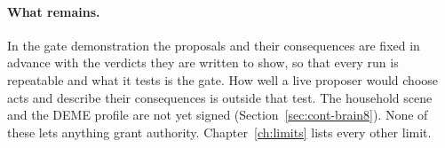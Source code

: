 \paragraph{What remains.}
In the gate demonstration the proposals and their consequences are fixed in advance with the
verdicts they are written to show, so that every run is repeatable and what it tests is the gate. How well a live
proposer would choose acts and describe their consequences is outside that test. The household scene and the DEME profile are not yet signed (Section~\ref{sec:cont-brain8}).
None of these lets anything grant authority. Chapter~\ref{ch:limits} lists every other limit.
\endgroup
